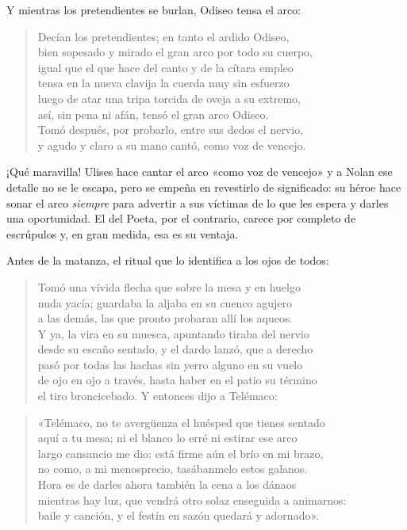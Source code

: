 Y mientras los pretendientes se burlan, Odiseo tensa el arco:

\begin{verse}
Decían los pretendientes; en tanto el ardido Odiseo,\\
bien sopesado y mirado el gran arco por todo su cuerpo,\\
igual que el que hace del canto y de la cítara empleo\\
tensa en la nueva clavija la cuerda muy sin esfuerzo\\
luego de atar una tripa torcida de oveja a su extremo,\\
así, sin pena ni afán, tensó el gran arco Odiseo.\\
Tomó después, por probarlo, entre sus dedos el nervio,\\
y agudo y claro a su mano cantó, como voz de vencejo.
\end{verse}

¡Qué maravilla! Ulises hace cantar el arco «como voz de vencejo» y a Nolan ese detalle no se le escapa, pero se empeña en revestirlo de significado: su héroe hace sonar el arco \emph{siempre} para advertir a sus víctimas de lo que les espera y darles una oportunidad. El del Poeta, por el contrario, carece por completo de escrúpulos y, en gran medida, esa es su ventaja.

Antes de la matanza, el ritual que lo identifica a los ojos de todos:

\begin{verse}
Tomó una vívida flecha que sobre la mesa y en huelgo\\
nuda yacía; guardaba la aljaba en su cuenco agujero\\
a las demás, las que pronto probaran allí los aqueos.\\
Y ya, la vira en su muesca, apuntando tiraba del nervio\\
desde su escaño sentado, y el dardo lanzó, que a derecho\\
pasó por todas las hachas sin yerro alguno en su vuelo\\
de ojo en ojo a través, hasta haber en el patio su término\\
el tiro broncicebado. Y entonces dijo a Telémaco:
\end{verse}

\begin{verse}
«Telémaco, no te avergüenza el huésped que tienes sentado\\
aquí a tu mesa; ni el blanco lo erré ni estirar ese arco\\
largo cansancio me dio: está firme aún el brío en mi brazo,\\
no como, a mi menosprecio, tasábanmelo estos galanos.\\
Hora es de darles ahora también la cena a los dánaos\\
mientras hay luz, que vendrá otro solaz enseguida a animarnos:\\
baile y canción, y el festín en sazón quedará y adornado».
\end{verse}


